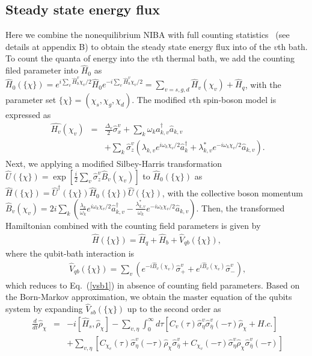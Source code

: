 \documentclass[twocolumn,preprintnumbers,amsmath,amssymb]{revtex4}
\begin{document}
\subsection{Steady state energy flux}
Here we combine the nonequilibrium NIBA with full counting statistics~\cite{mesposito2009rmp} (see details at {\color{blue}appendix B}) to obtain the steady state energy flux into of the $v$th bath.
To count the quanta of energy into the $v$th thermal bath, we add the counting filed parameter into $\hat{H}_0$ as
$\hat{H}_0(\{\chi\})=e^{i\sum_v\hat{H}^v_b\chi_v/2}\hat{H}_0e^{-i\sum_v\hat{H}^v_b\chi_v/2}=\sum_{v=s,g,d}\hat{H}_v(\chi_v)+\hat{H}_q$,
with the parameter set $\{\chi\}=(\chi_s,\chi_g,\chi_d)$.
The modified $v$th spin-boson model is expressed as
\begin{eqnarray}~\label{hchi0}
\hat{H_v}(\chi_v)&=&\frac{\Delta_v}{2}\hat{\sigma}^v_x+\sum_{k}\omega_k\hat{a}^{\dag}_{k,v}\hat{a}_{k,v}\\
&&+\sum_{k}\hat{\sigma}^{v}_z(\lambda_{k,v}e^{i\omega_k\chi_{v}/2}\hat{a}^{\dag}_{k}+\lambda^{*}_{k,v}e^{-i\omega_k\chi_v/2}\hat{a}_{k,v}).\nonumber
\end{eqnarray}
Next, we applying a modified Silbey-Harris transformation $\hat{U}(\{\chi\})=\exp[\frac{i}{2}\sum_v\hat{\sigma}^v_z\hat{B}_v({\chi}_v)]$
to $\hat{H}_0(\{\chi\})$
as $\hat{H}(\{\chi\})=\hat{U}^{\dag}(\{\chi\})\hat{H}_0(\{\chi\})\hat{U}(\{\chi\})$,
with the collective boson momentum
$\hat{B}_v({\chi}_v)=2i\sum_k(\frac{\lambda_{k}}{\omega_k}e^{i\omega_k\chi_v/2}\hat{a}^{\dag}_{k,v}
-\frac{\lambda^{*}_{k,v}}{\omega_k}e^{-i\omega_k\chi_v/2}\hat{a}_{k,v})$.
Then, the transformed Hamiltonian combined with the counting field parameters is given by
\begin{eqnarray}
\hat{H}(\{\chi\})=\hat{H}_q+\hat{H}_b+\hat{V}_{qb}(\{\chi\}),
\end{eqnarray}
where the qubit-bath interaction is
\begin{eqnarray}~\label{v1}
\hat{V}_{qb}(\{\chi\})=\sum_v(e^{-i\hat{B}_v(\chi_v)}\hat{\sigma}^v_++e^{i\hat{B}_v(\chi_v)}\hat{\sigma}^v_-),
\end{eqnarray}
which reduces to Eq.~(\ref{vsb1})  in absence of counting field parameters.
Based on the Born-Markov approximation, we obtain the master equation of the qubits system by expanding $\hat{V}_{sb}(\{\chi\})$ up to the second order as
\begin{eqnarray}~\label{qmechi1}
\frac{d}{dt}\hat{\rho}_{\chi}&=&-i[\hat{H}_s,\hat{\rho}_{\chi}]
-\sum_{v,\eta}\int^{\infty}_0d{\tau}[C_v(\tau)\hat{\sigma}^v_{\eta}\hat{\sigma}^v_{\overline{\eta}}(-\tau)\hat{\rho}_{\chi}+H.c.]\nonumber\\
&&+\sum_{v,\eta}[C_{\chi_v}(\tau)\hat{\sigma}^v_{\eta}(-\tau)\hat{\rho}_{\chi}\hat{\sigma}^v_{\overline{\eta}}
+C_{\chi_v}(-\tau)\hat{\sigma}^v_{\eta}\hat{\rho}_{\chi}\hat{\sigma}^v_{\overline{\eta}}(-\tau)]\nonumber\\
\end{eqnarray}
\end{document}
